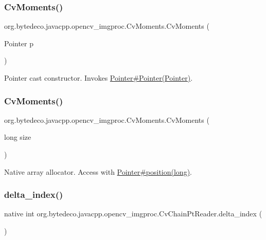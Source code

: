 \subsubsection{\texorpdfstring{Cv\+Moments()}{CvMoments()}\hspace{0.1cm}{\footnotesize\ttfamily [1/2]}}
{\footnotesize\ttfamily org.\+bytedeco.\+javacpp.\+opencv\+\_\+imgproc.\+Cv\+Moments.\+Cv\+Moments (\begin{DoxyParamCaption}\item[{Pointer}]{p }\end{DoxyParamCaption})\hspace{0.3cm}{\ttfamily [inline]}}

Pointer cast constructor. Invokes \hyperlink{}{Pointer\#\+Pointer(\+Pointer)}. \mbox{\label{group__imgproc_ga2608f0796eed0d0a7b7bcd8f95ce04c1}} 
\subsubsection{\texorpdfstring{Cv\+Moments()}{CvMoments()}\hspace{0.1cm}{\footnotesize\ttfamily [2/2]}}
{\footnotesize\ttfamily org.\+bytedeco.\+javacpp.\+opencv\+\_\+imgproc.\+Cv\+Moments.\+Cv\+Moments (\begin{DoxyParamCaption}\item[{long}]{size }\end{DoxyParamCaption})\hspace{0.3cm}{\ttfamily [inline]}}

Native array allocator. Access with \hyperlink{}{Pointer\#position(long)}. \mbox{\label{group__imgproc_gabc93e64b255df79172c001b0f8d238ce}} 
\subsubsection{\texorpdfstring{delta\+\_\+index()}{delta\_index()}}
{\footnotesize\ttfamily native int org.\+bytedeco.\+javacpp.\+opencv\+\_\+imgproc.\+Cv\+Chain\+Pt\+Reader.\+delta\+\_\+index (\begin{DoxyParamCaption}{ }\end{DoxyParamCaption})}

